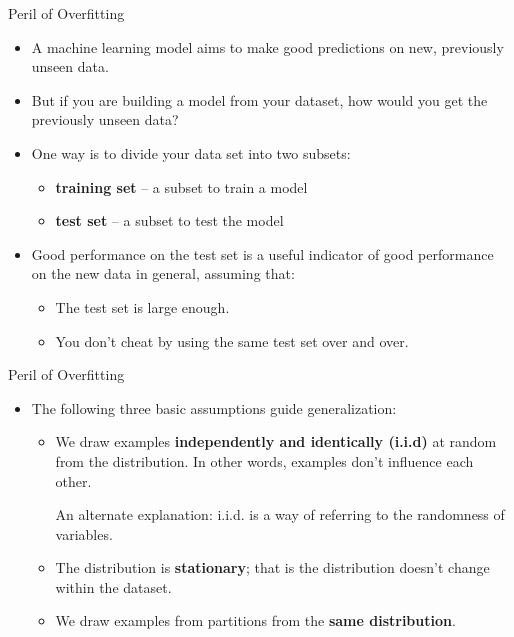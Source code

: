 \documentclass{beamer}
\begin{document}
\begin{frame}{Peril of Overfitting}
\begin{itemize}
\item A machine learning model aims to make good predictions on new, previously unseen data. 

\medskip
\item But if you are building a model from your dataset, how would you get the previously unseen data? 

\medskip
\item One way is to divide your data set into two subsets:

\medskip
\begin{itemize}
\item {\bf training set} -- a subset to train a model

\medskip
\item {\bf test set} -- a subset to test the model
\end{itemize}

\medskip
\item Good performance on the test set is a useful indicator of good performance on the new data in general, assuming that:

\medskip    
\begin{itemize}
\item The test set is large enough.

\medskip
\item You don't cheat by using the same test set over and over.
\end{itemize}
\end{itemize}
\end{frame}


\begin{frame}{Peril of Overfitting}
\begin{itemize}
    \item The following three basic assumptions guide generalization:
    
    \medskip
    \begin{itemize}
        \item We draw examples {\bf independently and identically (i.i.d)} at random from the distribution. In other words, examples don't influence each other. 
        
        An alternate explanation: i.i.d. is a way of referring to the randomness of variables.

		\medskip
        \item The distribution is {\bf stationary}; that is the distribution doesn't change within the dataset.
        
        \medskip
        \item We draw examples from partitions from the {\bf same distribution}.
    \end{itemize}
\end{itemize}
\end{frame}
\end{document}
